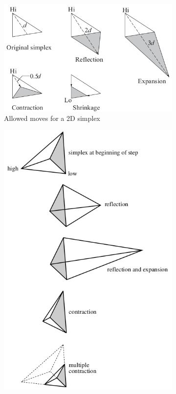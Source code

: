 \begin{figure}[ht]
    \begin{subfigure}[h]{0.6\linewidth}
        \includegraphics[width=\linewidth]{img/2dsimplex.png}
        \caption{Allowed moves for a 2D simplex}
        \label{fig:2dsimplex-png}
    \end{subfigure}
    \hfill
    \begin{subfigure}[h]{0.4\linewidth}
        \includegraphics[width=\linewidth]{img/3dsimplex.png}

\end{subfigure}
\end{figure}
